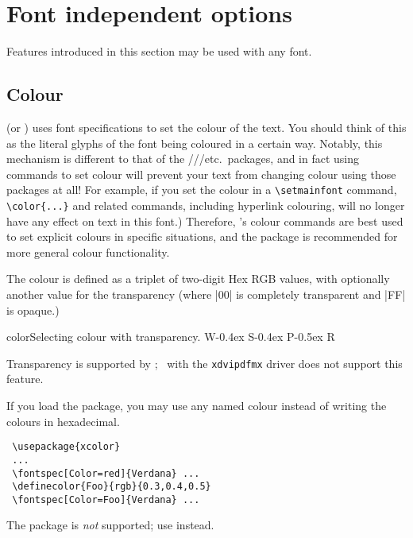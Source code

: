 \section{Font independent options}
\label{sec:font-ind-features}

Features introduced in this section may be used with any font.

\subsection{Colour}

 (or ) uses font specifications to set the colour of
the text.
You should think of this as the literal glyphs of the font being coloured in a certain way.
Notably, this mechanism is different to that of the ///etc.\ packages, and in fact using  commands to set colour will prevent your text from changing colour using those packages at all!
For example, if you set the colour in a \verb|\setmainfont| command, \verb|\color{...}| and related commands, including hyperlink colouring, will no longer have any effect on text in this font.)
Therefore, 's colour commands are best used to set explicit colours in specific situations, and the  package is recommended for more general colour functionality.

The colour is defined as a triplet of two-digit Hex RGB
values, with optionally another value for the transparency (where
|00| is completely transparent and |FF| is opaque.)
\begin{Lexample}{color}{Selecting colour with transparency.}
  \fontsize{48}{48}
  {W}\kern-0.4ex
  {S}\kern-0.4ex
  {P}\kern-0.5ex
  {R}
\end{Lexample}
Transparency is supported by \LuaLaTeX; \XeLaTeX\ with the \texttt{xdvipdfmx} driver
does not support this feature.

If you load the  package, you may use any named colour instead
of writing the colours in hexadecimal.
\begin{Verbatim}
 \usepackage{xcolor}
 ...
 \fontspec[Color=red]{Verdana} ...
 \definecolor{Foo}{rgb}{0.3,0.4,0.5}
 \fontspec[Color=Foo]{Verdana} ...
\end{Verbatim}
The  package is \emph{not} supported; use  instead.

